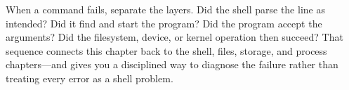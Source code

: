 When a command fails, separate the layers. Did the shell parse the line as intended? Did it find and start the program? Did the program accept the arguments? Did the filesystem, device, or kernel operation then succeed? That sequence connects this chapter back to the shell, files, storage, and process chapters—and gives you a disciplined way to diagnose the failure rather than treating every error as a shell problem.
